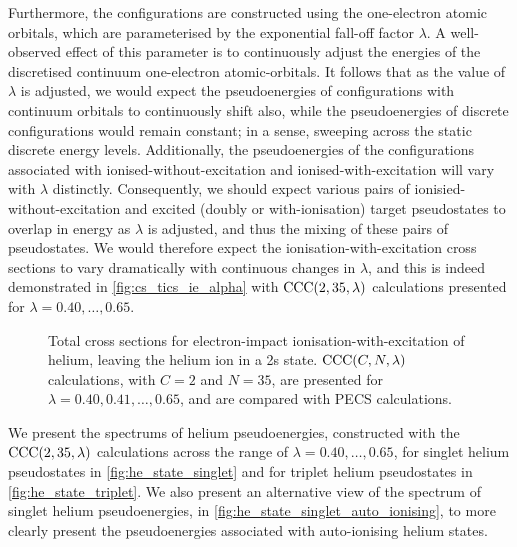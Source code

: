 \documentclass[]{article}
\begin{document}
Furthermore, the configurations are constructed using the one-electron atomic
orbitals, which are parameterised by the exponential fall-off factor $\lambda$.
A well-observed effect of this parameter is to continuously adjust the energies
of the discretised continuum one-electron atomic-orbitals.
It follows that as the value of $\lambda$ is adjusted, we would expect the
pseudoenergies of configurations with continuum orbitals to continuously shift
also, while the pseudoenergies of discrete configurations would remain constant;
in a sense, sweeping across the static discrete energy levels.
Additionally, the pseudoenergies of the configurations associated with
ionised-without-excitation and ionised-with-excitation will vary with $\lambda$
distinctly.
Consequently, we should expect various pairs of ionisied-without-excitation and
excited (doubly or with-ionisation) target pseudostates to overlap in energy as
$\lambda$ is adjusted, and thus the mixing of these pairs of pseudostates.
We would therefore expect the ionisation-with-excitation cross sections to vary
dramatically with continuous changes in $\lambda$, and this is indeed
demonstrated in \autoref{fig:cs_tics_ie_alpha} with
$\mathrm{CCC}\lr{2, 35, \lambda}$ calculations presented for
$\lambda = 0.40, \dotsc, 0.65$.

\begin{figure}[h]
  \begin{center}
    
  \end{center}
  \caption[TICS-with-excitation: $\mathrm{CCC}\lr{2, 35, \lambda}$]{
    Total cross sections for electron-impact ionisation-with-excitation of
    helium, leaving the helium ion in a 2s state.
    $\mathrm{CCC}(C, N, \lambda)$ calculations, with $C = 2$ and $N = 35$,
    are presented for $\lambda = 0.40, 0.41, \dotsc, 0.65$, and are compared
    with PECS \cite{PhysRevA.81.022716} calculations.
  }
  \label{fig:cs_tics_ie_alpha}
\end{figure}

\clearpage


We present the spectrums of helium pseudoenergies, constructed with the
$\mathrm{CCC}\lr{2, 35, \lambda}$ calculations across the range of
$\lambda = 0.40, \dotsc, 0.65$, for singlet helium pseudostates
in \autoref{fig:he_state_singlet} and for triplet helium pseudostates
in \autoref{fig:he_state_triplet}.
We also present an alternative view of the spectrum of singlet helium
pseudoenergies, in \autoref{fig:he_state_singlet_auto_ionising}, to more clearly
present the pseudoenergies associated with auto-ionising helium states.
\end{document}

